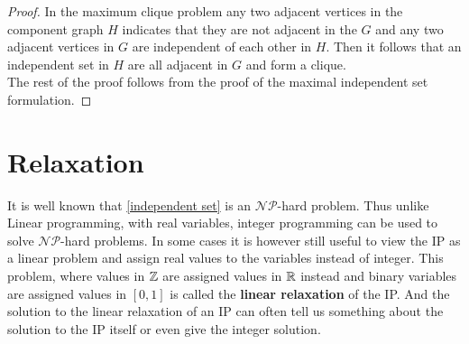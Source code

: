 \begin{example}
\begin{proof}
\noindent In the maximum clique problem any two adjacent vertices in the component graph $H$ indicates that they are not adjacent in the $G$ and any two adjacent vertices in $G$ are independent of each other in $H$. Then it follows that an independent set in $H$ are all adjacent in $G$ and form a clique. \\
The rest of the proof follows from the proof of the maximal independent set formulation.
\end{proof}
\end{example}
\section{Relaxation}\label{relaxation}
It is well known that \ref{independent set} is an $\mathcal{NP}$-hard problem. Thus unlike Linear programming, with real variables, integer programming can be used to solve $\mathcal{NP}$-hard problems. In some cases it is however still useful to view the IP as a linear problem and assign real values to the variables instead of integer. This problem, where values in $\mathbb{Z}$ are assigned values in $\mathbb{R}$ instead and binary variables are assigned values in $[0,1]$ is called the \textbf{linear relaxation} of the IP. And the solution to the linear relaxation of an IP can often tell us something about the solution to the IP itself or even give the integer solution.

